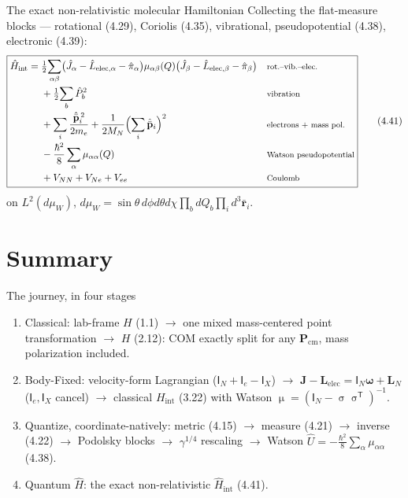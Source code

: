\documentclass[aspectratio=169,10pt]{beamer}
\newcommand{\Mmu}{\upmu}        %
\newcommand{\Msig}{\upsigma}    %
\newcommand{\stagenum}{0}
\newcommand{\setstage}[1]{\renewcommand{\stagenum}{#1}}
\begin{document}
\begin{frame}{The exact non-relativistic molecular Hamiltonian}
\setstage{4}
Collecting the flat-measure blocks --- rotational (4.29), Coriolis (4.35), vibrational, pseudopotential (4.38), electronic (4.39):
\begin{equation*}
\boxed{
\begin{aligned}
\hat H_{\mathrm{int}}=\;&\tfrac12\!\sum_{\alpha\beta}\bigl(\hat J_\alpha-\hat L_{\mathrm{elec},\alpha}-\hat\pi_\alpha\bigr)\mu_{\alpha\beta}(Q)\bigl(\hat J_\beta-\hat L_{\mathrm{elec},\beta}-\hat\pi_\beta\bigr) &&\text{\footnotesize rot.--vib.--elec.}\\[-1pt]
&+\tfrac12\!\sum_b\hat P_b^2 &&\text{\footnotesize vibration}\\[-1pt]
&+\sum_i\frac{\hat{\bar{\mathbf p}}_i^{\,2}}{2m_e}+\frac{1}{2M_N}\Bigl(\sum_i\hat{\bar{\mathbf p}}_i\Bigr)^{2} &&\text{\footnotesize electrons + mass pol.}\\[-1pt]
&-\frac{\hbar^2}{8}\sum_\alpha\mu_{\alpha\alpha}(Q) &&\text{\footnotesize Watson pseudopotential}\\[-1pt]
&+V_{NN}+V_{Ne}+V_{ee} &&\text{\footnotesize Coulomb}
\end{aligned}}\tag{4.41}
\end{equation*}
\centering\footnotesize on $L^2(d\mu_W)$, $d\mu_W=\sin\theta\,d\phi d\theta d\chi\prod_b dQ_b\prod_i d^3\bar{\mathbf r}_i$. %
\end{frame}


\section{Summary}

\begin{frame}{The journey, in four stages}
\setstage{4}
\begin{enumerate}
  \item[\textbf{1.}] \alert{Classical}: lab-frame $H$ (1.1) $\to$ one mixed mass-centered point transformation $\to$ $H$ (2.12): COM exactly split for any $\mathbf P_{\mathrm{cm}}$, mass polarization included.
  \item[\textbf{2.}] \alert{Body-Fixed}: velocity-form Lagrangian ($\mathsf I_N+\mathsf I_e-\mathsf I_X$) $\to$ $\mathbf J-\mathbf L_{\mathrm{elec}}=\mathsf I_N\boldsymbol\omega+\mathbf L_N$ ($\mathsf I_e,\mathsf I_X$ cancel) $\to$ classical $H_{\mathrm{int}}$ (3.22) with Watson $\Mmu=(\mathsf I_N-\Msig\Msig^{\mathsf T})^{-1}$.
  \item[\textbf{3.}] \alert{Quantize}, coordinate-natively: metric (4.15) $\to$ measure (4.21) $\to$ inverse (4.22) $\to$ Podolsky blocks $\to$ $\gamma^{1/4}$ rescaling $\to$ Watson $\hat U=-\tfrac{\hbar^2}{8}\sum_\alpha\mu_{\alpha\alpha}$ (4.38).
  \item[\textbf{4.}] \alert{Quantum $\hat H$}: the exact non-relativistic $\hat H_{\mathrm{int}}$ (4.41).
\end{enumerate}
\end{frame}
\end{document}
